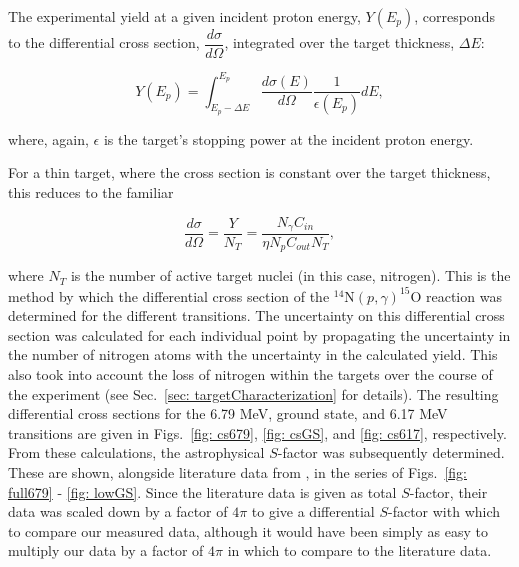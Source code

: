The experimental yield at a given incident proton energy, $Y(E_{p})$, corresponds to the differential cross section, $\dfrac{d \sigma}{d \Omega}$, integrated over the target thickness, $\Delta E$:

\begin{equation}
Y(E_{p}) = \int_{E_{p} - \Delta E}^{E_{p}} \dfrac{d \sigma(E)}{d \Omega} \dfrac{1}{\epsilon(E_{p})} dE,
\label{eqn: yieldCS}
\end{equation}

\noindent where, again, $\epsilon$ is the target's stopping power at the incident proton energy. 

For a thin target, where the cross section is constant over the target thickness, this reduces to the familiar 

\begin{equation}
\dfrac{d \sigma}{d \Omega} = \dfrac{Y}{N_{T}} = \dfrac{N_{\gamma}C_{in}} {\eta  N_{p} C_{out} N_{T}},
\label{eqn: thinTargetCS}
\end{equation}

\noindent where $N_{T}$ is the number of active target nuclei (in this case, nitrogen). This is the method by which the differential cross section of the $^{14}$N$\left( p,\gamma \right) ^{15}$O reaction was determined for the different transitions. The uncertainty on this differential cross section was calculated for each individual point by propagating the uncertainty in the number of nitrogen atoms with the uncertainty in the calculated yield. This also took into account the loss of nitrogen within the targets over the course of the experiment (see Sec.\ \ref{sec: targetCharacterization} for details). The resulting differential cross sections for the 6.79 MeV, ground state, and 6.17 MeV transitions are given in Figs.\ \ref{fig: cs679}, \ref{fig: csGS}, and \ref{fig: cs617}, respectively. From these calculations, the astrophysical $S$-factor was subsequently determined. These are shown, alongside literature data from \cite{Schroder1987, Imbriani2005, Runkle2005, Li2016}, in the series of Figs.\ \ref{fig: full679} - \ref{fig: lowGS}. Since the literature data is given as total $S$-factor, their data was scaled down by a factor of $4\pi$ to give a differential $S$-factor with which to compare our measured data, although it would have been simply as easy to multiply our data by a factor of $4\pi$ in which to compare to the literature data. 




